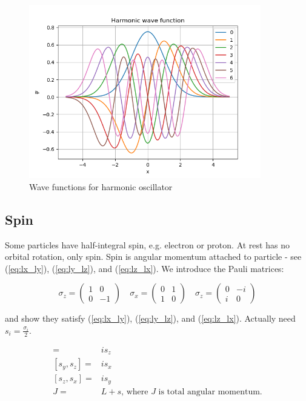 \documentclass[]{article}
\begin{document}
\begin{figure}[H]
	\caption{Wave functions for harmonic oscillator}\label{fig:wave:harmonic}
	\includegraphics[width=0.9\textwidth]{harmonic_wavefunction}
\end{figure}

\subsection{Spin}

Some particles have half-integral spin, e.g. electron or proton. At rest has no orbital rotation, only spin. Spin is angular momentum attached to particle - see (\ref{eq:lx_ly}), (\ref{eq:ly_lz}), and (\ref{eq:lz_lx}). We introduce the Pauli matrices:

$$
\sigma_z = \begin{pmatrix}
1 & 0 \\
0 & -1
\end{pmatrix}
\quad
\sigma_x = \begin{pmatrix}
0 & 1 \\
1 & 0
\end{pmatrix}
\quad
\sigma_z = \begin{pmatrix}
0 & -i \\
i & 0
\end{pmatrix}
$$

and show they satisfy (\ref{eq:lx_ly}), (\ref{eq:ly_lz}), and (\ref{eq:lz_lx}). Actually need $s_i=\frac{\sigma_i}{2}$.

\begin{align*}
[s_x,s_y] =& i s_z \\
[s_y,s_z] =& i s_x\\
[s_z,s_x] =& i s_y\\
J=&L+s\text{, where $J$ is total angular momentum.}
\end{align*}
\end{document}
